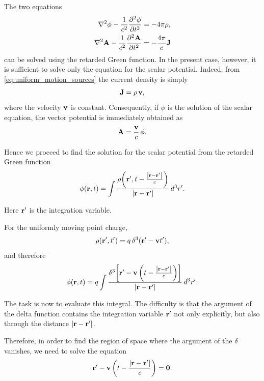 \documentclass[12pt]{article}
\begin{document}
The two equations
\begin{align}
  \nabla^2\phi
  -
  \frac{1}{c^2}\frac{\partial^2 \phi}{\partial t^2}
  &=
  -4\pi\rho,
  \\
  \nabla^2\vb{A}
  -
  \frac{1}{c^2}\frac{\partial^2 \vb{A}}{\partial t^2}
  &=
  -\frac{4\pi}{c}\vb{J}
\end{align}
can be solved using the retarded Green function. In the present case, however,
it is sufficient to solve only the equation for the scalar potential. Indeed,
from \eqref{eq:uniform_motion_sources} the current density is simply
\begin{equation}
  \vb J=\rho\,\vb v,
\end{equation}
where the velocity $\vb v$ is constant. Consequently, if $\phi$ is the solution
of the scalar equation, the vector potential is immediately obtained as
\begin{equation}
  \vb A
  =
  \frac{\vb v}{c}\,\phi.
\end{equation}

Hence we proceed to find the solution for the scalar potential from the retarded Green function
\begin{equation}
  \phi(\vb{r},t)
  =
  \int
  \frac{
    \rho\!\left(
      \vb{r}',
      t-\frac{\abs{\vb{r}-\vb{r}'}}{c}
    \right)
  }{
    \abs{\vb{r}-\vb{r}'}
  }
  \,d^3 r'.
  \label{eq:scalar_potential_green}
\end{equation}

Here $\vb r'$ is the integration variable.

For the uniformly moving point charge,
\[
  \rho(\vb{r}',t')
  =
  q\,\delta^3(\vb{r}'-\vb{v}t'),
\]
and therefore
\begin{equation}
  \phi(\vb{r},t)
  =
  q
  \int
  \frac{
    \delta^3\!\left[
      \vb{r}'
      -
      \vb{v}
      \left(
        t-\frac{\abs{\vb{r}-\vb{r}'}}{c}
      \right)
    \right]
  }{
    \abs{\vb{r}-\vb{r}'}
  }
  \,d^3 r'.
  \label{eq:scalar_potential_delta}
\end{equation}

The task is now to evaluate this integral. The difficulty is that the argument
of the delta function contains the integration variable $\vb{r}'$ not only explicitly, but also through
the distance $\abs{\vb{r}-\vb{r}'}$.

Therefore, in order to find the region of space where the argument of the $\delta$ vanishes, we need to solve the equation
\begin{equation}
  \vb{r}'
  -
  \vb{v}
  \left(
    t-\frac{\abs{\vb{r}-\vb{r}'}}{c}
  \right)
  =
  \vb{0}.
  \label{eq:source_position_condition}
\end{equation}
\end{document}
